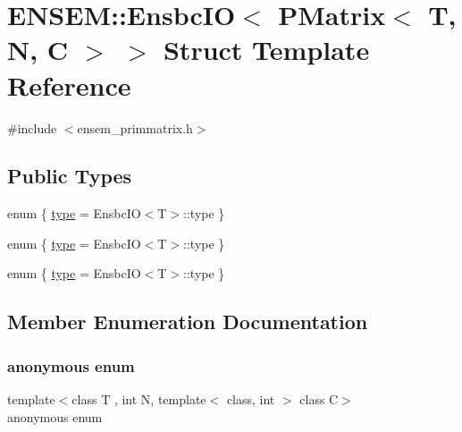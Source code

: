 \hypertarget{structENSEM_1_1EnsbcIO_3_01PMatrix_3_01T_00_01N_00_01C_01_4_01_4}{}\section{E\+N\+S\+EM\+:\+:Ensbc\+IO$<$ P\+Matrix$<$ T, N, C $>$ $>$ Struct Template Reference}
\label{structENSEM_1_1EnsbcIO_3_01PMatrix_3_01T_00_01N_00_01C_01_4_01_4}


{\ttfamily \#include $<$ensem\+\_\+primmatrix.\+h$>$}

\subsection*{Public Types}
\begin{DoxyCompactItemize}
\item 
enum \{ \mbox{\hyperlink{structENSEM_1_1EnsbcIO_3_01PMatrix_3_01T_00_01N_00_01C_01_4_01_4_a674cd01cc2383eb152990b864fcd0f23ab2030d38e88d687f09c823ba14fc80ef}{type}} = Ensbc\+IO$<$T$>$\+:\+:type
 \}
\item 
enum \{ \mbox{\hyperlink{structENSEM_1_1EnsbcIO_3_01PMatrix_3_01T_00_01N_00_01C_01_4_01_4_a674cd01cc2383eb152990b864fcd0f23ab2030d38e88d687f09c823ba14fc80ef}{type}} = Ensbc\+IO$<$T$>$\+:\+:type
 \}
\item 
enum \{ \mbox{\hyperlink{structENSEM_1_1EnsbcIO_3_01PMatrix_3_01T_00_01N_00_01C_01_4_01_4_a674cd01cc2383eb152990b864fcd0f23ab2030d38e88d687f09c823ba14fc80ef}{type}} = Ensbc\+IO$<$T$>$\+:\+:type
 \}
\end{DoxyCompactItemize}


\subsection{Member Enumeration Documentation}
\mbox{\label{structENSEM_1_1EnsbcIO_3_01PMatrix_3_01T_00_01N_00_01C_01_4_01_4_a2ceec7f204f9f1a7161d1f74e8d0a558}} 
\subsubsection{\texorpdfstring{anonymous enum}{anonymous enum}}
{\footnotesize\ttfamily template$<$class T , int N, template$<$ class, int $>$ class C$>$ \\
anonymous enum}

